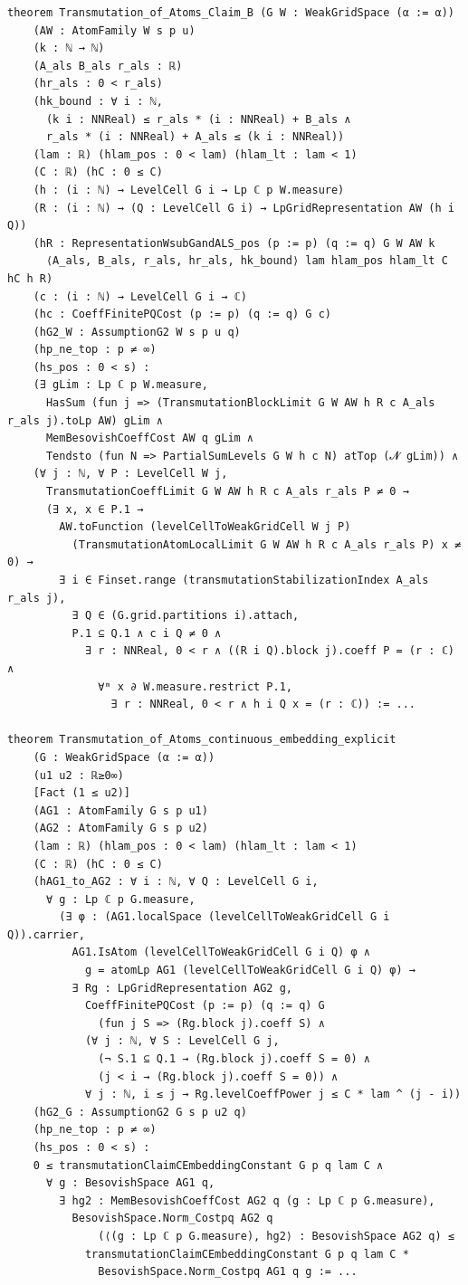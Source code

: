 \documentclass[11pt]{amsart}
\theoremstyle{definition}
\begin{document}
\begin{lstlisting}[style=lean,basicstyle=\ttfamily\scriptsize]
theorem Transmutation_of_Atoms_Claim_B (G W : WeakGridSpace (α := α))
    (AW : AtomFamily W s p u)
    (k : ℕ → ℕ)
    (A_als B_als r_als : ℝ)
    (hr_als : 0 < r_als)
    (hk_bound : ∀ i : ℕ,
      (k i : NNReal) ≤ r_als * (i : NNReal) + B_als ∧
      r_als * (i : NNReal) + A_als ≤ (k i : NNReal))
    (lam : ℝ) (hlam_pos : 0 < lam) (hlam_lt : lam < 1)
    (C : ℝ) (hC : 0 ≤ C)
    (h : (i : ℕ) → LevelCell G i → Lp ℂ p W.measure)
    (R : (i : ℕ) → (Q : LevelCell G i) → LpGridRepresentation AW (h i Q))
    (hR : RepresentationWsubGandALS_pos (p := p) (q := q) G W AW k
      ⟨A_als, B_als, r_als, hr_als, hk_bound⟩ lam hlam_pos hlam_lt C hC h R)
    (c : (i : ℕ) → LevelCell G i → ℂ)
    (hc : CoeffFinitePQCost (p := p) (q := q) G c)
    (hG2_W : AssumptionG2 W s p u q)
    (hp_ne_top : p ≠ ∞)
    (hs_pos : 0 < s) :
    (∃ gLim : Lp ℂ p W.measure,
      HasSum (fun j => (TransmutationBlockLimit G W AW h R c A_als r_als j).toLp AW) gLim ∧
      MemBesovishCoeffCost AW q gLim ∧
      Tendsto (fun N => PartialSumLevels G W h c N) atTop (𝓝 gLim)) ∧
    (∀ j : ℕ, ∀ P : LevelCell W j,
      TransmutationCoeffLimit G W AW h R c A_als r_als P ≠ 0 →
      (∃ x, x ∈ P.1 →
        AW.toFunction (levelCellToWeakGridCell W j P)
          (TransmutationAtomLocalLimit G W AW h R c A_als r_als P) x ≠ 0) →
        ∃ i ∈ Finset.range (transmutationStabilizationIndex A_als r_als j),
          ∃ Q ∈ (G.grid.partitions i).attach,
          P.1 ⊆ Q.1 ∧ c i Q ≠ 0 ∧
            ∃ r : NNReal, 0 < r ∧ ((R i Q).block j).coeff P = (r : ℂ) ∧
              ∀ᵐ x ∂ W.measure.restrict P.1,
                ∃ r : NNReal, 0 < r ∧ h i Q x = (r : ℂ)) := ...

theorem Transmutation_of_Atoms_continuous_embedding_explicit
    (G : WeakGridSpace (α := α))
    (u1 u2 : ℝ≥0∞)
    [Fact (1 ≤ u2)]
    (AG1 : AtomFamily G s p u1)
    (AG2 : AtomFamily G s p u2)
    (lam : ℝ) (hlam_pos : 0 < lam) (hlam_lt : lam < 1)
    (C : ℝ) (hC : 0 ≤ C)
    (hAG1_to_AG2 : ∀ i : ℕ, ∀ Q : LevelCell G i,
      ∀ g : Lp ℂ p G.measure,
        (∃ φ : (AG1.localSpace (levelCellToWeakGridCell G i Q)).carrier,
          AG1.IsAtom (levelCellToWeakGridCell G i Q) φ ∧
            g = atomLp AG1 (levelCellToWeakGridCell G i Q) φ) →
          ∃ Rg : LpGridRepresentation AG2 g,
            CoeffFinitePQCost (p := p) (q := q) G
              (fun j S => (Rg.block j).coeff S) ∧
            (∀ j : ℕ, ∀ S : LevelCell G j,
              (¬ S.1 ⊆ Q.1 → (Rg.block j).coeff S = 0) ∧
              (j < i → (Rg.block j).coeff S = 0)) ∧
            ∀ j : ℕ, i ≤ j → Rg.levelCoeffPower j ≤ C * lam ^ (j - i))
    (hG2_G : AssumptionG2 G s p u2 q)
    (hp_ne_top : p ≠ ∞)
    (hs_pos : 0 < s) :
    0 ≤ transmutationClaimCEmbeddingConstant G p q lam C ∧
      ∀ g : BesovishSpace AG1 q,
        ∃ hg2 : MemBesovishCoeffCost AG2 q (g : Lp ℂ p G.measure),
          BesovishSpace.Norm_Costpq AG2 q
              (⟨(g : Lp ℂ p G.measure), hg2⟩ : BesovishSpace AG2 q) ≤
            transmutationClaimCEmbeddingConstant G p q lam C *
              BesovishSpace.Norm_Costpq AG1 q g := ...
\end{lstlisting}
\end{document}
